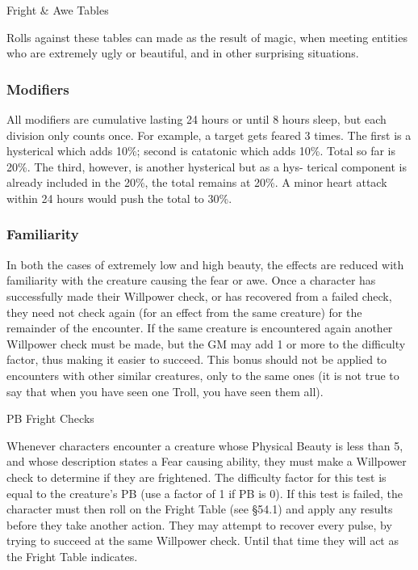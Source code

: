 \begin{Tables}{Fright \& Awe Tables}

\begin{multicols}{3}
    
Rolls against these tables can made as the result of magic, when
meeting entities who are extremely ugly or beautiful, and in other
surprising situations.

\subsubsection{Modifiers}

All modifiers are cumulative lasting 24 hours or until 8 hours sleep,
but each division only counts once.  For example, a target gets feared
3 times.  The first is a hysterical which adds 10\%; second is
catatonic which adds 10\%.  Total so far is 20\%.  The third, however,
is another hysterical but as a hys- terical component is already
included in the 20\%, the total remains at 20\%.  A minor heart attack
within 24 hours would push the total to 30\%.

\subsubsection{Familiarity}

In both the cases of extremely low and high beauty, the effects are
reduced with familiarity with the creature causing the fear or awe.
Once a character has successfully made their Willpower check, or has
recovered from a failed check, they need not check again (for an
effect from the same creature) for the remainder of the encounter.  If
the same creature is encountered again another Willpower check must be
made, but the GM may add 1 or more to the difficulty factor, thus
making it easier to succeed.  This bonus should not be applied to
encounters with other similar creatures, only to the
same ones (it is not true to say that when you have 
seen one Troll, you have seen them all). 

PB Fright Checks 

Whenever characters encounter a creature whose Physical Beauty is less
than 5, and whose description states a Fear causing ability, they must
make a Willpower check to determine if they are frightened.  The
difficulty factor for this test is equal to the creature’s PB (use a
factor of 1 if PB is 0).  If this test is failed, the character must
then roll on the Fright Table (see §54.1) and apply any results before
they take another action. They may attempt to recover every pulse, by
trying to succeed at the same Willpower check.  Until that time they
will act as the Fright Table indicates.


\end{multicols}
\end{Tables}

